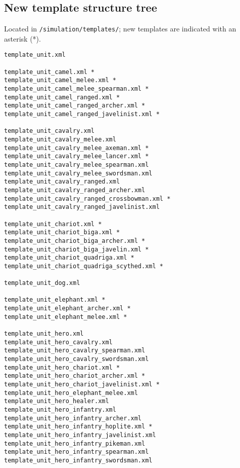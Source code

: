 \documentclass{article}
\begin{document}
\clearpage
\subsection{New template structure tree}
Located in \texttt{/simulation/templates/}; new templates are indicated with an asterisk (*).\\

\begin{multicols}{2}
{\small %
\begin{verbatim}
template_unit.xml

template_unit_camel.xml *
template_unit_camel_melee.xml *
template_unit_camel_melee_spearman.xml *
template_unit_camel_ranged.xml *
template_unit_camel_ranged_archer.xml *
template_unit_camel_ranged_javelinist.xml *

template_unit_cavalry.xml
template_unit_cavalry_melee.xml
template_unit_cavalry_melee_axeman.xml *
template_unit_cavalry_melee_lancer.xml *
template_unit_cavalry_melee_spearman.xml
template_unit_cavalry_melee_swordsman.xml
template_unit_cavalry_ranged.xml
template_unit_cavalry_ranged_archer.xml
template_unit_cavalry_ranged_crossbowman.xml *
template_unit_cavalry_ranged_javelinist.xml

template_unit_chariot.xml *
template_unit_chariot_biga.xml *
template_unit_chariot_biga_archer.xml *
template_unit_chariot_biga_javelin.xml *
template_unit_chariot_quadriga.xml *
template_unit_chariot_quadriga_scythed.xml *

template_unit_dog.xml

template_unit_elephant.xml *
template_unit_elephant_archer.xml *
template_unit_elephant_melee.xml *

template_unit_hero.xml
template_unit_hero_cavalry.xml
template_unit_hero_cavalry_spearman.xml
template_unit_hero_cavalry_swordsman.xml
template_unit_hero_chariot.xml *
template_unit_hero_chariot_archer.xml *
template_unit_hero_chariot_javelinist.xml *
template_unit_hero_elephant_melee.xml
template_unit_hero_healer.xml
template_unit_hero_infantry.xml
template_unit_hero_infantry_archer.xml
template_unit_hero_infantry_hoplite.xml *
template_unit_hero_infantry_javelinist.xml
template_unit_hero_infantry_pikeman.xml
template_unit_hero_infantry_spearman.xml
template_unit_hero_infantry_swordsman.xml
\end{verbatim}

\columnbreak

}
\end{multicols}
\end{document}
